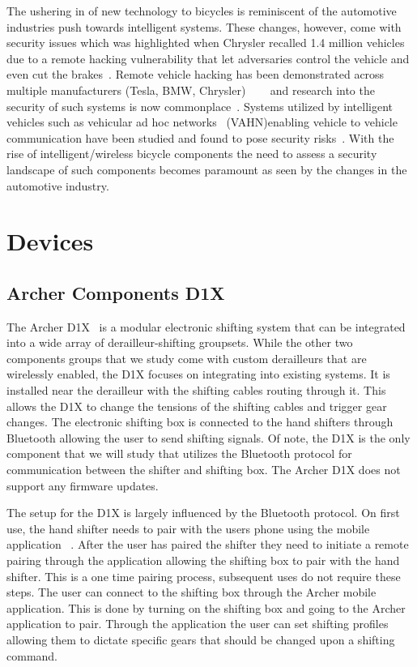\documentclass[letterpaper,twocolumn,10pt]{article}
\begin{document}
The ushering in of new technology to bicycles is reminiscent of the automotive industries push towards intelligent systems. These changes, however, come with security issues which was highlighted when Chrysler recalled 1.4 million vehicles due to a remote hacking vulnerability that let adversaries control the vehicle and even cut the brakes~\cite{ChryslerRecall}. Remote vehicle hacking has been demonstrated across multiple manufacturers (Tesla, BMW, Chrysler) ~\cite{Tesla}~\cite{BMW}~\cite{Chrysler} and research into the security of such systems is now commonplace~\cite{dibaei2019overview}. Systems utilized by intelligent vehicles such as vehicular ad hoc networks~\cite{SAKIZ201733} (VAHN)enabling vehicle to vehicle communication have been studied and found to pose security risks~\cite{ SAKIZ201733}. With the rise of intelligent/wireless bicycle components the need to assess a security landscape of such components becomes paramount as seen by the changes in the automotive industry.


\section{Devices}
\subsection{Archer Components D1X}

The Archer D1X~\cite{Archer} is a modular electronic shifting system that can be integrated into a wide array of derailleur-shifting groupsets. While the other two components groups that we study come with custom derailleurs that are wirelessly enabled, the D1X focuses on integrating into existing systems. It is installed near the derailleur with the shifting cables routing through it. This allows the D1X to change the tensions of the shifting cables and trigger gear changes. The electronic shifting box is connected to the hand shifters through Bluetooth allowing the user to send shifting signals. Of note, the D1X is the only component that we will study that utilizes the Bluetooth protocol for communication between the shifter and shifting box. The Archer D1X does not support any firmware updates.

The setup for the D1X is largely influenced by the Bluetooth protocol. On first use, the hand shifter needs to pair with the users phone using the mobile application~ \cite{ArcherApp}. After the user has paired the shifter they need to initiate a remote pairing through the application allowing the shifting box to pair with the hand shifter. This is a one time pairing process, subsequent uses do not require these steps. The user can connect to the shifting box through the Archer mobile application. This is done by turning on the shifting box and going to the Archer application to pair. Through the application the user can set shifting profiles allowing them to dictate specific gears that should be changed upon a shifting command.
\end{document}
